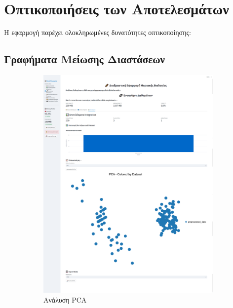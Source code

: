 \documentclass[11pt,a4paper]{article}
\begin{document}
\section{Οπτικοποιήσεις των Αποτελεσμάτων}

Η εφαρμογή παρέχει ολοκληρωμένες δυνατότητες οπτικοποίησης:

\subsection{Γραφήματα Μείωσης Διαστάσεων}

\begin{figure}[H]
    \centering
    \begin{subfigure}{0.45\textwidth}
       \includegraphics[width=1.0\linewidth]{pca_plot.png}
        \caption{Ανάλυση PCA}
    \end{subfigure}
    \hfill
    \begin{subfigure}{0.45\textwidth}

\end{subfigure}
\end{figure}
\end{document}
